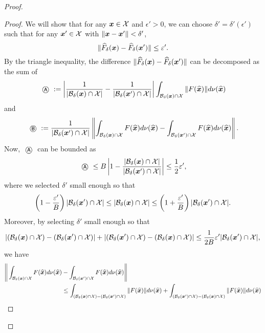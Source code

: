 \begin{proof}
    \begin{proof}
        We will show that for any ${\bm{x}} \in {\mathcal{X}}$ and $\epsilon' > 0$, we can choose $\delta' = \delta'(\epsilon')$ such that for any ${\bm{x}}' \in {\mathcal{X}}$ with $\|{\bm{x}} - {\bm{x}}'\| < \delta'$,
        \begin{equation*}
            \| \widehat{F}_\delta({\bm{x}}) - \widehat{F}_\delta({\bm{x}}') \| \leq \varepsilon'.
        \end{equation*}
    By the triangle inequality, the difference $\| \widehat{F}_\delta({\bm{x}}) - \widehat{F}_\delta({\bm{x}}') \|$ can be decomposed as the sum of 
    \begin{equation*}
        \tcircle{A} \defeq \left| \frac{1}{|\cB_{\delta}(\vx) \cap \cX|} - \frac{1}{|\cB_{\delta}(\vx') \cap \cX|} \right|  \int_{\cB_{\delta}(\vx) \cap \cX} \| F(\hatvx) \| d\nu(\hatvx)
    \end{equation*}
    and
    \begin{equation*}
        \tcircle{B} \defeq \frac{1}{|\cB_{\delta}(\vx') \cap \cX|} \left\| \int_{\cB_{\delta}(\vx) \cap \cX} F(\hatvx) d\nu(\hatvx) - \int_{\cB_{\delta}(\vx') \cap \cX} F(\hatvx) d\nu(\hatvx) \right\|.
    \end{equation*}
    Now, $\tcircle{A}$ can be bounded as
    \begin{equation*}
        \tcircle{A} \leq B \left| 1 - \frac{ | \cB_\delta(\vx) \cap \cX| }{| \cB_\delta(\vx') \cap \cX|} \right| \leq \frac{1}{2} \epsilon',
    \end{equation*}
    where we selected $\delta'$ small enough so that 
    \begin{equation*}
         \left(1 - \frac{\varepsilon'}{B} \right) | {\mathcal{B}}_\delta({\bm{x}}') \cap {\mathcal{X}}| \leq | {\mathcal{B}}_\delta({\bm{x}}) \cap {\mathcal{X}}| \leq  \left(1 + \frac{\varepsilon'}{B} \right) | {\mathcal{B}}_\delta({\bm{x}}') \cap {\mathcal{X}}|.
    \end{equation*}
    Moreover, by selecting $\delta'$ small enough so that
    \begin{equation}
        \label{eq:smalldelta}
        | ({\mathcal{B}}_\delta({\bm{x}}) \cap {\mathcal{X}} ) - ({\mathcal{B}}_\delta({\bm{x}}') \cap {\mathcal{X}}) | + | ({\mathcal{B}}_\delta({\bm{x}}') \cap {\mathcal{X}}) - ({\mathcal{B}}_\delta({\bm{x}}) \cap {\mathcal{X}}) | \leq \frac{1}{2B} \varepsilon' | {\mathcal{B}}_\delta({\bm{x}}') \cap {\mathcal{X}} |,
    \end{equation}
    we have
    \begin{align*}
        \Bigg\| \int_{\cB_{\delta}(\vx) \cap \cX} F(\hatvx) d\nu(\hatvx) &- \int_{\cB_{\delta}(\vx') \cap \cX} F(\hatvx) d\nu(\hatvx) \Bigg\| \\
        &\leq  \int_{ (\cB_{\delta}(\vx) \cap \cX) \setminus (\cB_{\delta}(\vx') \cap \cX) } \| F(\hatvx) \| d\nu(\hatvx)  + \int_{(\cB_{\delta}(\vx') \cap \cX) \setminus (\cB_{\delta}(\vx) \cap \cX)} \| F(\hatvx) \| d\nu(\hatvx) \\

\end{align*}
\end{proof}
\end{proof}
